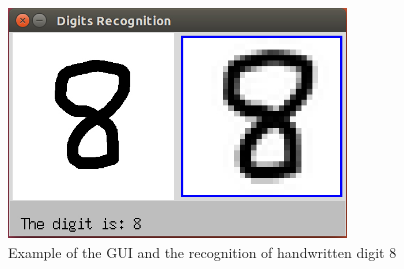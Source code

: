 \begin{figure}
\caption{Example of the GUI and the recognition of handwritten digit 8}
\label{fig:GUI_8}
\centering
\includegraphics[width=0.8\textwidth]{Images/GUI_8}
\end{figure}
